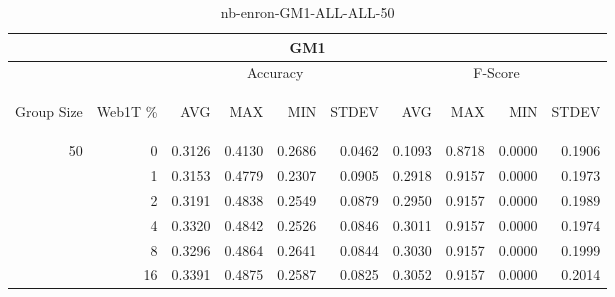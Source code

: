 \begin{center}
\begin{table}[htbp]
\begin{tabular}{ | r | r | r | r | r | r | r | r | r | r |}
\hline
\multicolumn{10}{|c|}{GM1}\\
\hline
 & & \multicolumn{4}{|c|}{Accuracy} & \multicolumn{4}{|c|}{F-Score}\\ \cline{3-10}
\begin{sideways}Group Size\end{sideways} & \begin{sideways}Web1T \%\end{sideways} & \begin{sideways}AVG\end{sideways} & \begin{sideways}MAX\end{sideways} & \begin{sideways}MIN\end{sideways} & \begin{sideways}STDEV\end{sideways} & \begin{sideways}AVG\end{sideways} & \begin{sideways}MAX\end{sideways} & \begin{sideways}MIN\end{sideways} & \begin{sideways}STDEV\end{sideways}\\
\hline
\multirow{5}{*}{50}
 & 0 & 0.3126 & 0.4130 & 0.2686 & 0.0462 & 0.1093 & 0.8718 & 0.0000 & 0.1906\\ \cline{2-10}
 & 1 & 0.3153 & 0.4779 & 0.2307 & 0.0905 & 0.2918 & 0.9157 & 0.0000 & 0.1973\\ \cline{2-10}
 & 2 & 0.3191 & 0.4838 & 0.2549 & 0.0879 & 0.2950 & 0.9157 & 0.0000 & 0.1989\\ \cline{2-10}
 & 4 & 0.3320 & 0.4842 & 0.2526 & 0.0846 & 0.3011 & 0.9157 & 0.0000 & 0.1974\\ \cline{2-10}
 & 8 & 0.3296 & 0.4864 & 0.2641 & 0.0844 & 0.3030 & 0.9157 & 0.0000 & 0.1999\\ \cline{2-10}
 & 16 & 0.3391 & 0.4875 & 0.2587 & 0.0825 & 0.3052 & 0.9157 & 0.0000 & 0.2014\\ \cline{2-10}
\hline
\end{tabular}
\caption{nb-enron-GM1-ALL-ALL-50}
\label{table:nb-enron-GM1-ALL-ALL-50}
\end{table}
\end{center}

